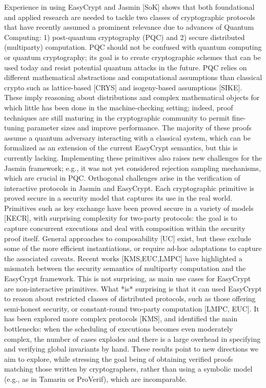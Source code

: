 \documentclass[preprint]{iacrtrans}
\begin{document}
Experience in using EasyCrypt and Jasmin [SoK] shows that both
foundational and applied research are needed to tackle two classes of
cryptographic protocols that have recently assumed a prominent
relevance due to advances of Quantum Computing: 1) post-quantum
cryptography (PQC) and 2) secure distributed (multiparty)
computation. PQC should not be confused with quantum computing or
quantum cryptography; its goal is to create cryptographic schemes that
can be used today and resist potential quantum attacks in the
future. PQC relies on different mathematical abstractions and
computational assumptions than classical crypto such as lattice-based
[CRYS] and isogeny-based assumptions [SIKE]. These imply reasoning
about distributions and complex mathematical objects for which little
has been done in the machine-checking setting; indeed, proof
techniques are still maturing in the cryptographic community to permit
fine-tuning parameter sizes and improve performance. The majority of
these proofs assume a quantum adversary interacting with a classical
system, which can be formalized as an extension of the current
EasyCrypt semantics, but this is currently lacking. Implementing these
primitives also raises new challenges for the Jasmin framework; e.g.,
it was not yet considered rejection sampling mechanisms, which are
crucial in PQC. Orthogonal challenges arise in the verification of
interactive protocols in Jasmin and EasyCrypt. Each cryptographic
primitive is proved secure in a security model that captures its use
in the real world. Primitives such as key exchange have been proved
secure in a variety of models [KECR], with surprising complexity for
two-party protocols: the goal is to capture concurrent executions and
deal with composition within the security proof itself. General
approaches to composability [UC] exist, but these exclude some of the
more efficient instantiations, or require ad-hoc adaptations to
capture the associated caveats.  Recent works [KMS,EUC,LMPC] have
highlighted a mismatch between the security semantics of multiparty
computation and the EasyCrypt framework. This is not surprising, as
main use cases for EasyCrypt are non-interactive primitives. What *is*
surprising is that it can used EasyCrypt to reason about restricted
classes of distributed protocols, such as those offering semi-honest
security, or constant-round two-party computation [LMPC, EUC]. It has
been explored more complex protocols [KMS], and identified the main
bottlenecks: when the scheduling of executions becomes even moderately
complex, the number of cases explodes and there is a large overhead in
specifying and verifying global invariants by hand. These results
point to new directions we aim to explore, while stressing the goal
being of obtaining verified proofs matching those written by
cryptographers, rather than using a symbolic model (e.g., as in
Tamarin or ProVerif), which are incomparable.
\end{document}
